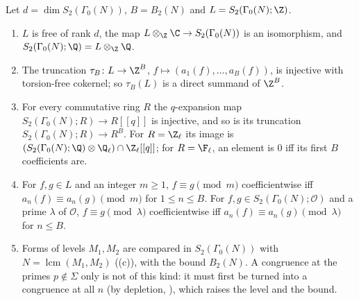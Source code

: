 \begin{corollary}\label{cor:modforms:integral-lattice}
Let $d=\dim S_2(\Gamma_0(N))$, $B=B_2(N)$ and $L=S_2(\Gamma_0(N);\Z)$.
\begin{enumerate}[label=(\roman*)]
\item $L$ is free of rank $d$, the map $L\otimes_\Z\C\to S_2(\Gamma_0(N))$ is an isomorphism, and $S_2(\Gamma_0(N);\Q)=L\otimes_\Z\Q$.
\item The truncation $\tau_B\colon L\to\Z^B$, $f\mapsto(a_1(f),\dots,a_B(f))$, is injective with torsion-free cokernel; so $\tau_B(L)$ is a direct summand of $\Z^B$.
\item For every commutative ring $R$ the $q$-expansion map $S_2(\Gamma_0(N);R)\to R[[q]]$ is injective, and so is its truncation $S_2(\Gamma_0(N);R)\to R^B$. For $R=\Z_\ell$ its image is
$(S_2(\Gamma_0(N);\Q)\otimes\Q_\ell)\cap\Z_\ell[[q]]$; for $R=\F_\ell$, an element is $0$ iff its first $B$ coefficients are.
\item For $f,g\in L$ and an integer $m\ge1$, $f\equiv g\pmod m$ coefficientwise iff $a_n(f)\equiv a_n(g)\pmod m$ for $1\le n\le B$. For $f,g\in S_2(\Gamma_0(N);\mathcal O)$ and a prime $\lambda$
of $\mathcal O$, $f\equiv g\pmod\lambda$ coefficientwise iff $a_n(f)\equiv a_n(g)\pmod\lambda$ for $n\le B$.
\item Forms of levels $M_1,M_2$ are compared in $S_2(\Gamma_0(N))$ with $N=\operatorname{lcm}(M_1,M_2)$ ((c)), with the bound $B_2(N)$. A congruence at the primes
$p\notin\Sigma$ only is not of this kind: it must first be turned into a congruence at all $n$ (by depletion, ), which raises the level and the bound.
\end{enumerate}
\end{corollary}

